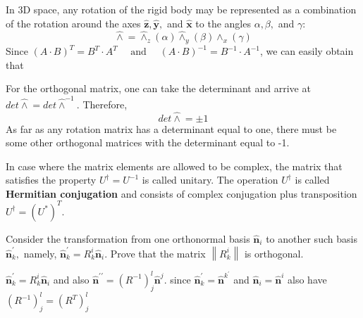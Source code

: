 In 3D space, any rotation of the rigid body may be represented as a combination of the rotation around the axes $\hat{\mathbf{z}}, \hat{\mathbf{y}},$ and $\hat{\mathbf{x}}$ to the angles $ \alpha, \beta,$ and $\gamma$:
$$
\hat{\wedge}=\hat{\wedge}_{z}(\alpha) \hat{\wedge}_{y}(\beta) \hat{\wedge}_{x}(\gamma)
$$
Since $(A \cdot B)^{T}=B^{T} \cdot A^{T} \quad \text { and } \quad(A \cdot B)^{-1}=B^{-1} \cdot A^{-1}$, we can easily obtain that 
\begin{qt}
For the orthogonal matrix, one can take the determinant and arrive at $det\hat{\wedge}=det\hat{\wedge}^{-1}$. Therefore, 
$$
det\hat{\wedge}=\pm1
$$
As far as any rotation matrix has a determinant equal to one, there must be some other orthogonal matrices with the determinant equal to -1.
\end{qt}
In case where the matrix elements are allowed to be complex, the matrix that satisfies the property $U^{\dagger}=U^{-1}$ is called unitary. The operation $U^{\dagger}$ is called \textbf{Hermitian conjugation} and consists of complex conjugation plus transposition $U^{\dagger}=\left(U^{*}\right)^{T}$.
\begin{example}
Consider the transformation from one orthonormal basis $\hat{\mathbf{n}}_{i}$ to another such basis $\hat{\mathbf{n}}_{k}^{\prime},$ namely, $\hat{\mathbf{n}}_{k}^{\prime}=R_{k}^{i} \hat{\mathbf{n}}_{i} .$ Prove that the matrix $\left\|R_{k}^{i}\right\|$ is orthogonal.

 $\hat{\mathbf{n}}_{k}^{\prime}=R_{k}^{i} \hat{\mathbf{n}}_{i}$ and also $\hat{\mathbf{n}}^{\prime \prime}=\left(R^{-1}\right)_{j}^{l} \hat{\mathbf{n}}^{j} .$ since $\hat{\mathbf{n}}_{k}^{\prime}=\hat{\mathbf{n}}^{k^{\prime}}$ and $\hat{\mathbf{n}}_{i}=\hat{\mathbf{n}}^{i}$
also have $\left(R^{-1}\right)_{j}^{l}=\left(R^{T}\right)_{j}^{l}$
\end{example}

